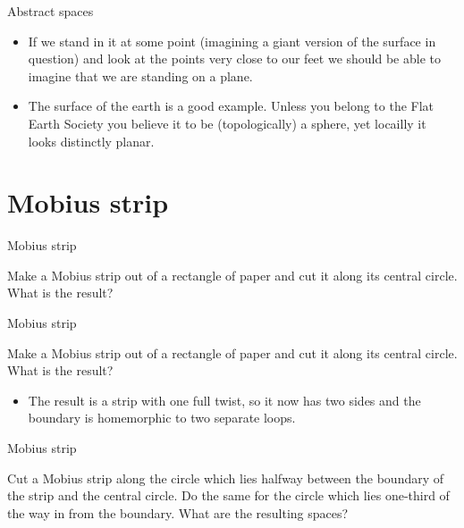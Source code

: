 \documentclass{beamer}
\begin{document}
\begin{frame}{Abstract spaces}
  \begin{definition}[Surface]
    \begin{itemize}
    \item If we stand in it at some point (imagining a giant version of the surface in question) and look at the points very close to our feet we should be able to imagine that we are standing on a plane.
    \item The surface of the earth is a good example. Unless you belong to the Flat Earth Society you believe it to be (topologically) a sphere, yet locailly it looks distinctly planar.
    \end{itemize}
  \end{definition}
\end{frame}

\section{Mobius strip}

\begin{frame}{Mobius strip}
  \begin{block}{}
    Make a Mobius strip out of a rectangle of paper and cut it along its central circle. What is the result?
  \end{block}
\end{frame}

\begin{frame}{Mobius strip}
  \begin{block}{}
    Make a Mobius strip out of a rectangle of paper and cut it along its central circle. What is the result?
    \begin{itemize}
    \item The result is a strip with one full twist, so it now has two sides and the boundary is homemorphic to two separate loops.
    \end{itemize}
  \end{block}
\end{frame}

\begin{frame}{Mobius strip}
  \begin{block}{}
    Cut a Mobius strip along the circle which lies halfway between the boundary of the strip and the central circle. Do the same for the circle which lies one-third of the way in from the boundary. What are the resulting spaces?
  \end{block}
\end{frame}
\end{document}
